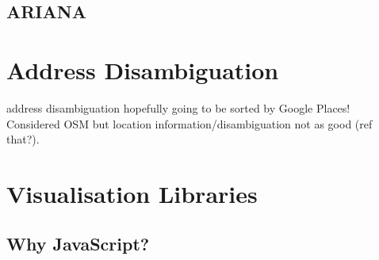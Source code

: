 \documentclass[PROP_AGutteridge_CS.tex]{subfiles}
\begin{document}
\subsection{ARIANA}

\section{Address Disambiguation}
address disambiguation hopefully going to be sorted by Google Places! Considered OSM but location information/disambiguation not as good (ref that?). 


\section{Visualisation Libraries}
\subsection{Why JavaScript?} 
   
 
\end{document}
